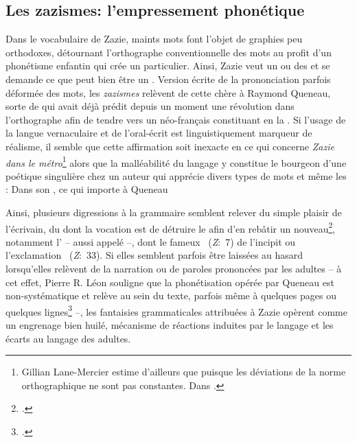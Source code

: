 \subsection{Les zazismes: l'empressement phonétique}
Dans le vocabulaire de Zazie, maints mots font l'objet de graphies peu orthodoxes, détournant l'orthographe conventionnelle des mots au profit d'un phonétisme enfantin qui crée un  particulier.
Ainsi, Zazie veut un  ou des  et se demande ce que peut bien être un .
Version écrite de la prononciation parfois déformée des mots, les \textit{zazismes} relèvent de cette  chère à Raymond Queneau, sorte de  qui avait déjà prédit depuis un moment une révolution dans l'orthographe afin de tendre vers un néo-français constituant en la .
Si l'usage de la langue vernaculaire et de l'oral-écrit est linguistiquement marqueur de réalisme, il semble que cette affirmation soit inexacte en ce qui concerne \textit{Zazie dans le métro}\footnote{Gillian Lane-Mercier estime d'ailleurs que  puisque les déviations de la norme orthographique ne sont pas constantes. Dans \cite[30]{Lane-Mercier1989}.} alors que la malléabilité du langage y constitue le bourgeon d'une poétique singulière chez un auteur qui apprécie divers types de mots et même les : 
Dans son , ce qui importe à Queneau 
\par
Ainsi, plusieurs digressions à la grammaire semblent relever du simple plaisir de l'écrivain, du  dont la vocation est de détruire le  afin d'en rebâtir un nouveau\footcite[80]{Leon1962}, notamment l' -- aussi appelé  --, dont le fameux ~(\textit{Z}:~7) de l'incipit ou l'exclamation ~(\textit{Z}:~33).
Si elles semblent parfois être laissées au hasard lorsqu'elles relèvent de la narration ou de paroles prononcées par les adultes -- à cet effet, Pierre R. Léon souligne que la phonétisation opérée par Queneau est non-systématique et relève  au sein du texte, parfois même à quelques pages ou quelques lignes\footcite[72-73]{Leon1962} --, les fantaisies grammaticales attribuées à Zazie opèrent comme un engrenage bien huilé, mécanisme de réactions induites par le langage et les écarts au langage des adultes.

